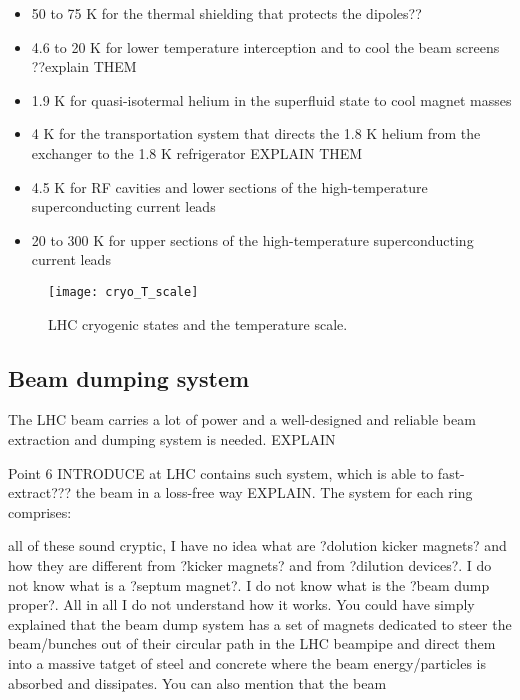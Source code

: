 \begin{itemize}
\item 50 to 75 K for the thermal shielding that protects the dipoles??
\item 4.6 to 20 K for lower temperature interception and to cool the beam screens ??explain THEM
\item 1.9 K for quasi-isotermal helium in the superfluid state to cool magnet masses
\item 4 K for the transportation system that directs the 1.8 K helium from the exchanger to the 1.8 K refrigerator EXPLAIN THEM
\item 4.5 K for RF cavities and lower sections of the high-temperature superconducting current leads
\item 20 to 300 K for upper sections of the high-temperature superconducting current leads
\end{itemize}

\begin{figure}[H]
  \centering
  \texttt{[image: cryo\_T\_scale]}
  \caption{LHC cryogenic states and the temperature scale.}\label{cryo_T_scale}
\end{figure}


\subsection{Beam dumping system}\label{sec:dumping}

The LHC beam carries a lot of power and a well-designed and reliable beam extraction and dumping system is needed. EXPLAIN

Point 6  INTRODUCE at LHC contains such system, which is able to fast-extract??? the beam in a loss-free way EXPLAIN. The system for each ring comprises:


all of these sound cryptic, I have no idea what are ?dolution kicker magnets? and how they are different from ?kicker magnets? and from ?dilution devices?. I do not know what is a ?septum magnet?. I do not know what is the ?beam dump proper?. All in all I do not understand how it works. You could have simply explained that the beam dump system has a set of magnets dedicated to steer the beam/bunches out of their circular path in the LHC beampipe and direct them into a massive tatget of steel and concrete where the beam energy/particles is absorbed and dissipates. You can also mention that the beam  



